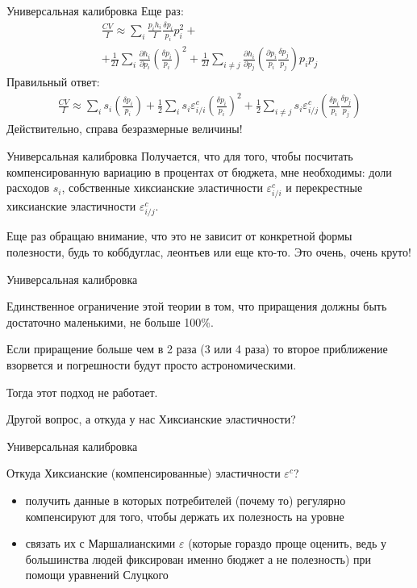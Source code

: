 \documentclass{beamer}
\begin{document}
\begin{frame}{Универсальная калибровка}
Еще раз:
\begin{gather*}
	\frac{CV}{I} \approx \sum_i \frac{p_i h_i}{I} \frac{\delta p_i}{p_i}p_i^2  + \\ + \frac{1}{2I}\sum_i \frac{\partial h_i}{\partial p_i} (\frac{\delta p_i}{p_i})^2 +  \frac{1}{2I}\sum_{i \neq j} \frac{\partial h_i}{\partial p_j} (\frac{\partial p_i}{p_i}\frac{\delta p_j}{p_j})p_ip_j
	\end{gather*}
Правильный ответ:
	\begin{gather*}
	\frac{CV}{I} \approx \sum_i s_i (\frac{\delta p_i}{p_i}) + \frac{1}{2}\sum_i s_i \varepsilon^c_{i/i} (\frac{\delta p_i}{p_i})^2 + \frac{1}{2}\sum_{i \neq j} s_i \varepsilon^c_{i/j}(\frac{\delta p_i}{p_i}\frac{\delta p_j}{p_j})
\end{gather*}
Действительно, справа безразмерные величины!
\end{frame}

\begin{frame}{Универсальная калибровка}
Получается, что для того, чтобы посчитать компенсированную вариацию в процентах от бюджета, мне необходимы: доли расходов $s_i$, собственные хиксианские эластичности $\varepsilon^c_{i/i}$ и перекрестные хиксианские эластичности $\varepsilon^c_{i/j}$. 

Еще раз обращаю внимание, что это \alert{не зависит от конкретной формы полезности}, будь то коббдуглас, леонтьев или еще кто-то. Это очень, очень круто!

\end{frame}

\begin{frame}{Универсальная калибровка}

Единственное ограничение этой теории в том, что приращения должны быть достаточно маленькими, не больше 100\%.

Если приращение больше чем в 2 раза (3 или 4 раза) то второе приближение взорвется и погрешности будут просто астрономическими. 

Тогда этот подход не работает. 

Другой вопрос, а откуда у нас Хиксианские эластичности?

\end{frame}

\begin{frame}{Универсальная калибровка}

Откуда Хиксианские (компенсированные) эластичности $\varepsilon^c$?

\begin{itemize}
  \item получить данные в которых потребителей (почему то) регулярно компенсируют для того, чтобы держать их полезность на уровне
  \item связать их с Маршалианскими $\varepsilon$ (которые гораздо проще оценить, ведь у большинства людей фиксирован именно бюджет а не полезность) при помощи уравнений Слуцкого
\end{itemize}

\end{frame}
\end{document}
